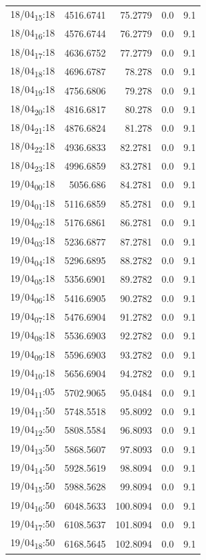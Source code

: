 \documentclass[11pt]{article}
\begin{document}
\begin{center}
\begin{tabular}{lrrrr}
18/04\textsubscript{15}:18 & 4516.6741 & 75.2779 & 0.0 & 9.1\\[0pt]
18/04\textsubscript{16}:18 & 4576.6744 & 76.2779 & 0.0 & 9.1\\[0pt]
18/04\textsubscript{17}:18 & 4636.6752 & 77.2779 & 0.0 & 9.1\\[0pt]
18/04\textsubscript{18}:18 & 4696.6787 & 78.278 & 0.0 & 9.1\\[0pt]
18/04\textsubscript{19}:18 & 4756.6806 & 79.278 & 0.0 & 9.1\\[0pt]
18/04\textsubscript{20}:18 & 4816.6817 & 80.278 & 0.0 & 9.1\\[0pt]
18/04\textsubscript{21}:18 & 4876.6824 & 81.278 & 0.0 & 9.1\\[0pt]
18/04\textsubscript{22}:18 & 4936.6833 & 82.2781 & 0.0 & 9.1\\[0pt]
18/04\textsubscript{23}:18 & 4996.6859 & 83.2781 & 0.0 & 9.1\\[0pt]
19/04\textsubscript{00}:18 & 5056.686 & 84.2781 & 0.0 & 9.1\\[0pt]
19/04\textsubscript{01}:18 & 5116.6859 & 85.2781 & 0.0 & 9.1\\[0pt]
19/04\textsubscript{02}:18 & 5176.6861 & 86.2781 & 0.0 & 9.1\\[0pt]
19/04\textsubscript{03}:18 & 5236.6877 & 87.2781 & 0.0 & 9.1\\[0pt]
19/04\textsubscript{04}:18 & 5296.6895 & 88.2782 & 0.0 & 9.1\\[0pt]
19/04\textsubscript{05}:18 & 5356.6901 & 89.2782 & 0.0 & 9.1\\[0pt]
19/04\textsubscript{06}:18 & 5416.6905 & 90.2782 & 0.0 & 9.1\\[0pt]
19/04\textsubscript{07}:18 & 5476.6904 & 91.2782 & 0.0 & 9.1\\[0pt]
19/04\textsubscript{08}:18 & 5536.6903 & 92.2782 & 0.0 & 9.1\\[0pt]
19/04\textsubscript{09}:18 & 5596.6903 & 93.2782 & 0.0 & 9.1\\[0pt]
19/04\textsubscript{10}:18 & 5656.6904 & 94.2782 & 0.0 & 9.1\\[0pt]
19/04\textsubscript{11}:05 & 5702.9065 & 95.0484 & 0.0 & 9.1\\[0pt]
19/04\textsubscript{11}:50 & 5748.5518 & 95.8092 & 0.0 & 9.1\\[0pt]
19/04\textsubscript{12}:50 & 5808.5584 & 96.8093 & 0.0 & 9.1\\[0pt]
19/04\textsubscript{13}:50 & 5868.5607 & 97.8093 & 0.0 & 9.1\\[0pt]
19/04\textsubscript{14}:50 & 5928.5619 & 98.8094 & 0.0 & 9.1\\[0pt]
19/04\textsubscript{15}:50 & 5988.5628 & 99.8094 & 0.0 & 9.1\\[0pt]
19/04\textsubscript{16}:50 & 6048.5633 & 100.8094 & 0.0 & 9.1\\[0pt]
19/04\textsubscript{17}:50 & 6108.5637 & 101.8094 & 0.0 & 9.1\\[0pt]
19/04\textsubscript{18}:50 & 6168.5645 & 102.8094 & 0.0 & 9.1\\[0pt]
\end{tabular}
\end{center}
\end{document}
